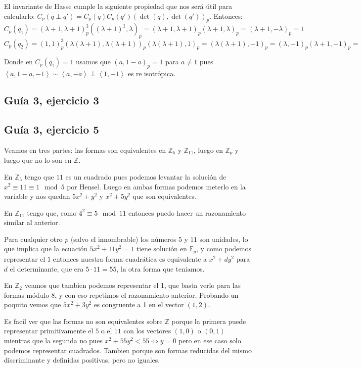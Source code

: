 \documentclass[12pt]{amsart}
\newcommand{\ZZ}{\mathbb{Z}}
\newcommand{\FF}{\mathbb{F}}
\newcommand{\lc}{\left<}
\newcommand{\rc}{\right>}
\theoremstyle{plain}
\begin{document}
El invariante de Hasse cumple la siguiente propiedad que nos 
será útil para calcularlo: $C_p(q\perp q') = C_p(q)C_p(q')
(\det(q),\det(q'))_p$. Entonces: 
$$C_p(q_1) = (\lambda+1,\lambda+1)_p^3 ((\lambda+1)^3,
\lambda)_p = (\lambda+1,\lambda+1)_p(\lambda+1,\lambda)_p = 
(\lambda+1,-\lambda)_p = 1$$
$$C_p(q_2)=(1,1)_p^3(\lambda (\lambda+1),\lambda (\lambda+1))_p
(\lambda(\lambda+1),1)_p = (\lambda (\lambda+1),-1)_p = 
(\lambda,-1)_p (\lambda+1,-1)_p = $$

Donde en $C_p(q_1)=1$ usamos que $(a,1-a)_p=1$ para $a\neq 1$ 
pues $\lc a,1-a,-1\rc \sim \lc a,-a\rc \perp\lc 1,-1\rc $ es re
isotrópica.

\subsection*{Guía 3, ejercicio 3}


\subsection*{Guía 3, ejercicio 5}

Veamos en tres partes: las formas son equivalentes en $\ZZ_5$
y $\ZZ_{11}$, luego en $\ZZ_p$ y luego que no lo son en $\ZZ$.

En $\ZZ_5$ tengo que $11$ es un cuadrado pues podemos levantar
la solución de $x^2 \equiv 11\equiv 1 \mod 5$ por Hensel. Luego en 
ambas formas podemos meterlo en la variable y nos quedan 
$5x^2+y^2$ y $x^2+5y^2$ que son equivalentes.

En $\ZZ_{11}$ tengo que, como $4^2 \equiv 5\mod 11$ 
entonces puedo hacer un razonamiento similar al anterior.

Para cualquier otro $p$ (salvo el innombrable) los números 
$5$ y $11$ son unidades, lo que implica que la ecuación 
$5x^2 + 11y^2=1$ tiene solución en $\FF_p$, y como podemos
representar el $1$ entonces nuestra forma cuadrática es
equivalente a $x^2+ d y^2$ para $d$ el determinante, que 
era $5\cdot 11 = 55$, la otra forma que teniamos. 

En $\ZZ_2$ veamos que tambien podemos representar el 1, que 
basta verlo para las formas módulo 8, y con eso repetimos el 
razonamiento anterior. Probando un poquito vemos que $5x^2
+3y^2$ es congruente a 1 en el vector $(1,2)$.

Es facil ver que las formas no son equivalentes sobre $\ZZ$
porque la primera puede representar primitivamente el $5$ o el 
$11$ con los vectores $(1,0)$ o $(0,1)$ mientras que la segunda
no pues $x^2 + 55y^2 < 55 \iff y=0$ pero en ese caso solo 
podemos representar cuadrados. Tambien porque son formas
reducidas del mismo discriminante y definidas positivas, pero 
no iguales.
\end{document}
